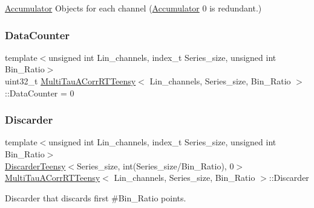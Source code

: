 \hyperlink{classAccumulator}{Accumulator} Objects for each channel (\hyperlink{classAccumulator}{Accumulator} \textquotesingle{}0\textquotesingle{} is redundant.) 

\mbox{\label{classMultiTauACorrRTTeensy_ab2fa5a0800fa7d9ee52900ced06ce935}} 
\subsubsection{\texorpdfstring{Data\+Counter}{DataCounter}}
{\footnotesize\ttfamily template$<$unsigned int Lin\+\_\+channels, index\+\_\+t Series\+\_\+size, unsigned int Bin\+\_\+\+Ratio$>$ \\
uint32\+\_\+t \hyperlink{classMultiTauACorrRTTeensy}{Multi\+Tau\+A\+Corr\+R\+T\+Teensy}$<$ Lin\+\_\+channels, Series\+\_\+size, Bin\+\_\+\+Ratio $>$\+::Data\+Counter = 0}

\mbox{\label{classMultiTauACorrRTTeensy_ad7bd7663180cdc3702ada3e726486311}} 
\subsubsection{\texorpdfstring{Discarder}{Discarder}}
{\footnotesize\ttfamily template$<$unsigned int Lin\+\_\+channels, index\+\_\+t Series\+\_\+size, unsigned int Bin\+\_\+\+Ratio$>$ \\
\hyperlink{classDiscarderTeensy}{Discarder\+Teensy}$<$Series\+\_\+size, int(Series\+\_\+size/Bin\+\_\+\+Ratio), 0$>$ \hyperlink{classMultiTauACorrRTTeensy}{Multi\+Tau\+A\+Corr\+R\+T\+Teensy}$<$ Lin\+\_\+channels, Series\+\_\+size, Bin\+\_\+\+Ratio $>$\+::Discarder\hspace{0.3cm}{\ttfamily [private]}}



Discarder that discards first \#\+Bin\+\_\+\+Ratio points. 

\mbox{\label{classMultiTauACorrRTTeensy_abd0498010dea716140e242ccbf426174}} 
